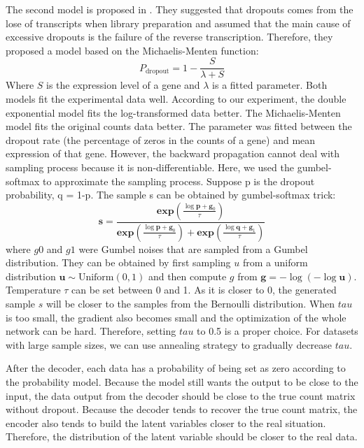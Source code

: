 The second model is proposed in \cite{andrews2017modelling}. They suggested that dropouts comes from the lose of transcripts when library preparation and assumed that the main cause of excessive dropouts is the failure of the reverse transcription. Therefore, they proposed a model based on the Michaelis-Menten function:
\begin{equation}
    P_{\text {dropout}}=1-\frac{S}{\lambda+S}
\end{equation}
Where $S$ is the expression level of a gene and $\lambda$ is a fitted parameter. 
Both models fit the experimental data well. According to our experiment, the double exponential model fits the log-transformed data better. The Michaelis-Menten model fits the original counts data better. 
The parameter was fitted between the dropout rate (the percentage of zeros in the counts of a gene) and mean expression of that gene.
However, the backward propagation cannot deal with sampling process because it is non-differentiable. Here, we used the gumbel-softmax \cite{jang2016categorical} to approximate the sampling process. Suppose p is the dropout probability, q = 1-p. The sample s can be obtained by gumbel-softmax trick:
\begin{equation}
    \boldsymbol{s}=\frac{\boldsymbol{e} \boldsymbol{x} \boldsymbol{p}\left(\frac{\log \boldsymbol{p}+\boldsymbol{g}_{0}}{\tau}\right)}{\boldsymbol{e x p}\left(\frac{\log \boldsymbol{p}+\boldsymbol{g}_{0}}{\tau}\right)+\boldsymbol{e} \boldsymbol{x} \boldsymbol{p}\left(\frac{\log \boldsymbol{q}+\boldsymbol{g}_{1}}{\tau}\right)}
\end{equation}
where $g0$ and $g1$ were Gumbel noises that are sampled from a Gumbel distribution. They can be obtained by first sampling $u$ from a uniform distribution $\boldsymbol{u} \sim \text {Uniform}(0,1)$ and then compute $g$ from $\boldsymbol{g}=-\log (-\log \boldsymbol{u})$. Temperature $\tau$ can be set between 0 and 1. As it is closer to 0, the generated sample $s$ will be closer to the samples from the Bernoulli distribution. When $tau$ is too small, the gradient also becomes small and the optimization of the whole network can be hard. Therefore, setting $tau$ to 0.5 is a proper choice. For datasets with large sample sizes, we can use annealing strategy to gradually decrease $tau$.

After the decoder, each data has a probability of being set as zero according to the probability model. Because the model still wants the output to be close to the input, the data output from the decoder should be close to the true count matrix without dropout. Because the decoder tends to recover the true count matrix, the encoder also tends to build the latent variables closer to the real situation. Therefore, the distribution of the latent variable should be closer to the real data.

